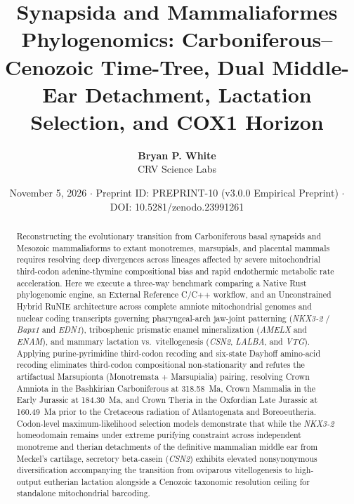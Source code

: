 \documentclass[10pt,letterpaper]{article}
\title{\textbf{Synapsida and Mammaliaformes Phylogenomics: Carboniferous--Cenozoic Time-Tree, Dual Middle-Ear Detachment, Lactation Selection, and COX1 Horizon}}
\author{\textbf{Bryan P. White}\\CRV Science Labs}
\date{November 5, 2026 $\cdot$ Preprint ID: PREPRINT-10 (v3.0.0 Empirical Preprint) $\cdot$ DOI: 10.5281/zenodo.23991261}
\begin{document}
\maketitle

\begin{abstract}
Reconstructing the evolutionary transition from Carboniferous basal synapsids and Mesozoic mammaliaforms to extant monotremes, marsupials, and placental mammals requires resolving deep divergences across lineages affected by severe mitochondrial third-codon adenine-thymine compositional bias and rapid endothermic metabolic rate acceleration. Here we execute a three-way benchmark comparing a Native Rust phylogenomic engine, an External Reference C/C++ workflow, and an Unconstrained Hybrid RuNIE architecture across complete amniote mitochondrial genomes and nuclear coding transcripts governing pharyngeal-arch jaw-joint patterning (\emph{NKX3-2} / \emph{Bapx1} and \emph{EDN1}), tribosphenic prismatic enamel mineralization (\emph{AMELX} and \emph{ENAM}), and mammary lactation vs.\ vitellogenesis (\emph{CSN2}, \emph{LALBA}, and \emph{VTG}). Applying purine-pyrimidine third-codon recoding and six-state Dayhoff amino-acid recoding eliminates third-codon compositional non-stationarity and refutes the artifactual Marsupionta (Monotremata + Marsupialia) pairing, resolving Crown Amniota in the Bashkirian Carboniferous at 318.58~Ma, Crown Mammalia in the Early Jurassic at 184.30~Ma, and Crown Theria in the Oxfordian Late Jurassic at 160.49~Ma prior to the Cretaceous radiation of Atlantogenata and Boreoeutheria. Codon-level maximum-likelihood selection models demonstrate that while the \emph{NKX3-2} homeodomain remains under extreme purifying constraint across independent monotreme and therian detachments of the definitive mammalian middle ear from Meckel's cartilage, secretory beta-casein (\emph{CSN2}) exhibits elevated nonsynonymous diversification accompanying the transition from oviparous vitellogenesis to high-output eutherian lactation alongside a Cenozoic taxonomic resolution ceiling for standalone mitochondrial barcoding.
\end{abstract}
\end{document}
